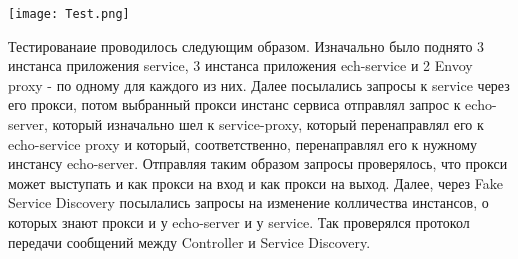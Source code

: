  \texttt{[image: Test.png]}

  Тестированаие проводилось следующим образом. Изначально было поднято 3 инстанса приложения service, 3 инстанса приложения ech-service и 2 Envoy proxy - по одному для каждого из них. Далее посылались запросы к service через его прокси, потом выбранный прокси инстанс сервиса отправлял запрос к echo-server, который изначально шел к service-proxy, который перенаправлял его к echo-service proxy и который, соответственно, перенаправлял его к нужному инстансу echo-server. Отправляя таким образом запросы проверялось, что прокси может выступать и как прокси на вход и как прокси на выход. Далее, через Fake Service Discovery посылались запросы на изменение колличества инстансов, о которых знают прокси и у echo-server и у service. Так проверялся протокол передачи сообщений между Controller и Service Discovery.    
